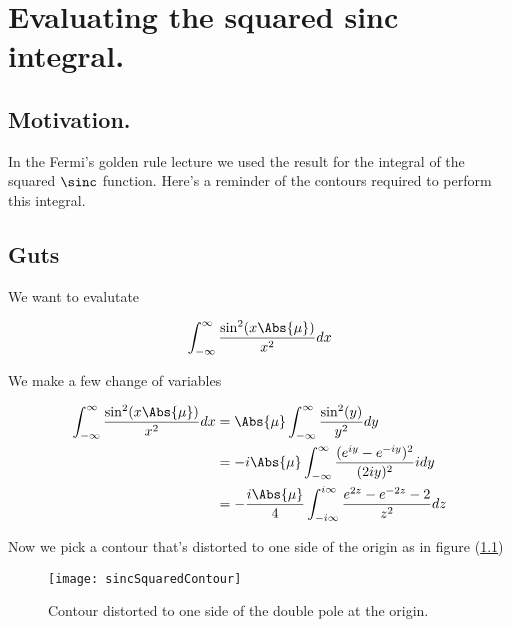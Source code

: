 
%

\chapter{Evaluating the squared sinc integral.}
\label{chap:sincIntegral}
{}
\date{Dec 10, 2011}

\beginArtWithToc

\section{Motivation.}

In the Fermi's golden rule lecture we used the result for the integral of the squared $\sinc$ function.  Here's a reminder of the contours required to perform this integral.

\section{Guts}

We want to evalutate

\begin{equation}\label{eqn:sincIntegral:10}
\int_{-\infty}^\infty \frac{\sin^2 (x\Abs{\mu})}{x^2} dx
\end{equation}

We make a few change of variables

\begin{align*}
\int_{-\infty}^\infty \frac{\sin^2 (x\Abs{\mu})}{x^2} dx
&=
\Abs{\mu} \int_{-\infty}^\infty \frac{\sin^2 (y)}{y^2} dy \\
&=
-i \Abs{\mu} \int_{-\infty}^\infty \frac{(e^{iy} - e^{-iy})^2}{(2 i y)^2} i dy \\
&=
-\frac{i \Abs{\mu}}{4} \int_{-i\infty}^{i\infty} \frac{e^{2z} - e^{-2z} - 2}{z^2} dz
\end{align*}

Now we pick a contour that's distorted to one side of the origin as in figure (\ref{fig:sincIntegral:sincSquaredContour})
\begin{figure}[htp]
   \centering
   \texttt{[image: sincSquaredContour]}
   \caption{Contour distorted to one side of the double pole at the origin.}\label{fig:sincIntegral:sincSquaredContour}
\end{figure}

